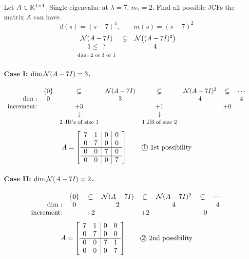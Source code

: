 \begin{example}
Let $A\in\mathbb{R}^{4\times4}$. Single eigenvalue at $\lambda=7$, $m_1=2$. Find all possible JCFs the matrix $A$ can have.
\[
d(s)=(s-7)^4,\qquad m(s)=(s-7)^2
\]
\[
\begin{array}{ccc}
\mathcal{N}(A-7I) & \subsetneq & \mathcal{N}\big((A-7I)^2\big)\\
1\le\ \ ? & & 4\\
\scriptstyle \dim=2\text{ or }3\text{ or }1 & &
\end{array}
\]


\paragraph{Case I: $\dim\mathcal{N}(A-7I)=3$.}
\[
\begin{array}{r@{\quad}ccccccc}
 & \{0\} & \subsetneq & \Null(A-7I) & \subsetneq & \Null(A-7I)^2 & \subsetneq & \cdots\\
\dim: & 0 & & 3 & & 4 & & 4\\
\text{increment:} & & +3 & & +1 & & +0 &\\
 & & \downarrow & & \downarrow & & &\\
 & & \text{\small 2 JB's of size 1} & & \text{\small 1 JB of size 2} & & &
\end{array}
\]
\[
A=\left[\begin{array}{cc|c|c}
7 & 1 & 0 & 0\\
0 & 7 & 0 & 0\\ \hline
0 & 0 & 7 & 0\\ \hline
0 & 0 & 0 & 7
\end{array}\right]
\qquad \text{\textcircled{\small 1} 1st possibility}
\]

\paragraph{Case II: $\dim\mathcal{N}(A-7I)=2$.}
\[
\begin{array}{r@{\quad}ccccccc}
 & \{0\} & \subsetneq & \Null(A-7I) & \subsetneq & \Null(A-7I)^2 & \subsetneq & \cdots\\
\dim: & 0 & & 2 & & 4 & & 4\\
\text{increment:} & & +2 & & +2 & & +0 &
\end{array}
\]
\[
A=\left[\begin{array}{cc|cc}
7 & 1 & 0 & 0\\
0 & 7 & 0 & 0\\ \hline
0 & 0 & 7 & 1\\
0 & 0 & 0 & 7
\end{array}\right]
\qquad \text{\textcircled{\small 2} 2nd possibility}
\]


\end{example}
